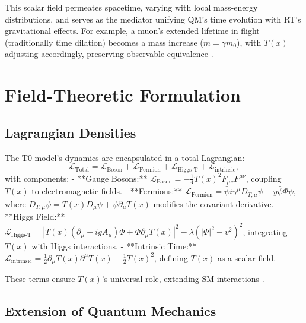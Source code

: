 \documentclass[12pt,a4paper]{article}
\newcommand{\Tfield}{T(x)}
\newcommand{\DhiggsT}{\Tfield (\partial_\mu + ig A_\mu) \Phi + \Phi \partial_\mu \Tfield}
\newcommand{\DTmu}{D_{T,\mu}}
\newcommand{\calL}{\mathcal{L}}
\begin{document}
	This scalar field permeates spacetime, varying with local mass-energy distributions, and serves as the mediator unifying QM’s time evolution with RT’s gravitational effects. For example, a muon’s extended lifetime in flight (traditionally time dilation) becomes a mass increase (\(m = \gamma m_0\)), with \(\Tfield\) adjusting accordingly, preserving observable equivalence \cite{pascher_quantum_2025}.
	
	\section{Field-Theoretic Formulation}
	\label{sec:field_theory}
	
	\subsection{Lagrangian Densities}
	\label{subsec:lagrangian}
	
	The T0 model’s dynamics are encapsulated in a total Lagrangian:
	\begin{equation}
		\calL_{\text{Total}} = \calL_{\text{Boson}} + \calL_{\text{Fermion}} + \calL_{\text{Higgs-T}} + \calL_{\text{intrinsic}},
		\label{eq:total_lagrangian}
	\end{equation}
	with components:
	- **Gauge Bosons:** \(\calL_{\text{Boson}} = -\frac{1}{4}\Tfield^2 F_{\mu\nu}F^{\mu\nu}\), coupling \(\Tfield\) to electromagnetic fields.
	- **Fermions:** \(\calL_{\text{Fermion}} = \bar{\psi}i\gamma^{\mu}\DTmu\psi - y\bar{\psi}\Phi\psi\), where \(\DTmu\psi = \Tfield D_{\mu}\psi + \psi\partial_{\mu}\Tfield\) modifies the covariant derivative.
	- **Higgs Field:** \(\calL_{\text{Higgs-T}} = |\DhiggsT|^2 - \lambda(|\Phi|^2 - v^2)^2\), integrating \(\Tfield\) with Higgs interactions.
	- **Intrinsic Time:** \(\calL_{\text{intrinsic}} = \frac{1}{2}\partial_{\mu}\Tfield\partial^{\mu}\Tfield - \frac{1}{2}\Tfield^2\), defining \(\Tfield\) as a scalar field.
	
	These terms ensure \(\Tfield\)’s universal role, extending SM interactions \cite{pascher_lagrange_2025}.
	
	\subsection{Extension of Quantum Mechanics}
	\label{subsec:qm_extension}
	
\end{document}

